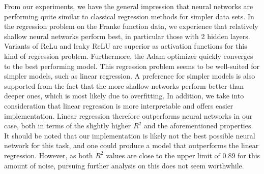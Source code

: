 From our experiments, we have the general impression that neural networks are performing quite similar to classical regression methods for simpler data sets. 
In the regression problem on the Franke function data, we experience that relatively shallow neural networks perform best, in particular those with 2 hidden layers. 
Variants of ReLu and leaky ReLU are superior as activation functions for this kind of regression problem.
Furthermore, the Adam optimizer quickly converges to the best performing model.
This regression problem seems to be well-suited for simpler models, such as linear regression. 
A preference for simpler models is also supported from the fact that the more shallow networks perform better than deeper ones, which is most likely due to overfitting. 
In addition, we take into consideration that linear regression is more interpretable and offers easier  implementation. 
Linear regression therefore outperforms neural networks in our case, both in terms of the slightly higher $R^2$ and the aforementioned properties. 
It should be noted that our implementation is likely not the best possible neural network for this task, and one could produce a model that outperforms the linear regression. 
However, as both $R^2$ values are close to the upper limit of $0.89$ for this amount of noise, pursuing further analysis on this does not seem worthwhile.


